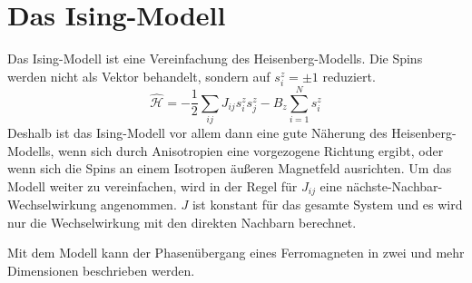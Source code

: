 \section{Das Ising-Modell}
Das Ising-Modell ist eine Vereinfachung des Heisenberg-Modells. Die Spins werden nicht als Vektor behandelt, sondern auf $s_i^z = \pm 1$ reduziert.
\begin{equation}
  \hat{\mathcal H} = -\frac 12\sum _{ij} J_{ij} s_i^z s_j^z - B_z \sum_{i=1}^N s_i^z
\end{equation}
Deshalb ist das Ising-Modell vor allem dann eine gute Näherung des Heisenberg-Modells, wenn sich durch Anisotropien eine vorgezogene Richtung ergibt, oder wenn sich die Spins an einem Isotropen äußeren Magnetfeld ausrichten.
Um das Modell weiter zu vereinfachen, wird in der Regel für $J_{ij}$ eine nächste-Nachbar-Wechselwirkung angenommen. $J$ ist konstant für das gesamte System und es wird nur die Wechselwirkung mit den direkten Nachbarn berechnet.

Mit dem Modell kann der Phasenübergang eines Ferromagneten in zwei und mehr Dimensionen beschrieben werden.